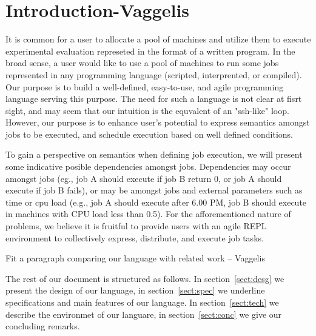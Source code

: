 \section{Introduction-Vaggelis}
\label{sect:intro}
It is common for a user to allocate a pool of machines and utilize
them to execute experimental evaluation represeted in the format of
a written program. In the broad sense, a user would like to use a
pool of machines to run some jobs represented in any programming
language (scripted, interprented, or compiled). Our purpose is to
build a well-defined, easy-to-use, and agile programming language
serving this purpose. The need for such a language is not clear at
fisrt sight, and may seem that our intuition is the equvalent of an
"ssh-like" loop. However, our purpose is to enhance user's potential
to express semantics amongst jobs to be executed, and schedule
execution based on well defined conditions.

To gain a perspective
on semantics when  defining job  execution, we will present some
indicative posible dependencies amongst jobs. Dependencies may
occur amongst jobs (eg., job A should execute if job B return 0,
or job A  should execute if job B fails), or may be amongst jobs
and external parameters such as time or cpu load (e.g., job A should
execute after 6.00 PM, job B should execute in machines with CPU
load less than 0.5). For the afforementioned nature of problems, we
believe it is fruitful to provide users with an agile REPL
environment to collectively express, distribute, and execute job
tasks.

Fit a paragraph comparing our language with related work -- Vaggelis

The rest of our document is structured as follows. In
section~\ref{sect:desg} we present the design of our language, in
section~\ref{sect:spec} we underline specifications and main
features of our language. In section~\ref{sect:tech} we describe
the environmet of our languare, in  section~\ref{sect:conc} we
give our concluding remarks.

